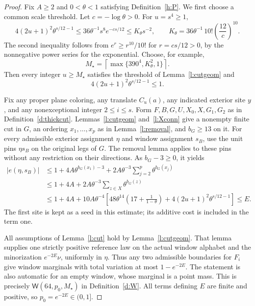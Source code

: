 \begin{proof}
Fix \(A\ge2\) and \(0<\theta<1\) satisfying
Definition~\ref{h:P}.  We first choose a common scale threshold.
Let \(c=-\log\theta>0\).  For \(u=s^4\ge1\),
\[
 4(2u+1)^2\theta^{s/12-1}
       \le36\theta^{-1}s^8 e^{-cs/12}
       \le K_\theta s^{-2},\qquad
 K_\theta=36\theta^{-1}\,10!\left(\frac{12}{c}\right)^{10}.
\]
The second inequality follows from
\(e^r\ge r^{10}/10!\) for \(r=cs/12>0\), by the
nonnegative power series for the exponential.
Choose, for example,
\[
 M_\star=\left\lceil\max\{390^4,K_\theta^2,1\}\right\rceil.
\]
Then every integer \(u\ge M_\star\) satisfies the threshold
of Lemma~\ref{l:cutgeom} and
\begin{equation}\label{e:windowtail}
                 4(2u+1)^2\theta^{s/12-1}\le1.
\end{equation}

Fix any proper plane coloring, any translate \(C_u(a)\),
any indicated exterior site \(y\), and any nonexceptional
integer \(2\le i\le s\).  Form \(F,B,G,U,X_0,X,G_1,G_2\)
as in Definition~\ref{d:thickcut}.  Lemmas~\ref{l:cutgeom}
and~\ref{l:Xconn} give a nonempty finite cut in \(G\), an
ordering \(x_1,\ldots,x_p\) as in Lemma~\ref{l:removal},
and \(b_G\ge13\) on it.  For every admissible exterior
assignment \(\eta\) and window assignment \(s_B\), use the
unit pins \(\eta s_B\) on the original legs of \(G\).
The removal lemma applies to these pins without any restriction
on their directions.  As \(b_G-3\ge0\), it yields
\begin{equation}\label{e:windowcutcost}
 \begin{split}
 |e(\eta,s_B)|
 &\le1+4A\theta^{b_G(x_1)-3}
                    +2A\theta^{-3}\sum_{j=2}^p\theta^{b_G(x_j)}\\
 &\le1+4A+2A\theta^{-3}\sum_{z\in X}\theta^{b_G(z)}\\
 &\le1+4A+10A\theta^{-4}
       \left[48\theta^{14}\left(17+\frac1{1-\theta}\right)
                        +4(2u+1)^2\theta^{s/12-1}\right]
 \le E.
 \end{split}
\end{equation}
The first site is kept as a seed in this estimate; its additive
cost is included in the term one.

All assumptions of Lemma~\ref{l:cut} hold by
Lemma~\ref{l:cutgeom}.  That lemma supplies one strictly
positive reference law on the actual window alphabet and the
minorization \(e^{-2E}\nu\), uniformly in \(\eta\).
Thus any two admissible boundaries for \(F_i\) give window
marginals with total variation at most \(1-e^{-2E}\).
The statement is also automatic for an empty window, whose
marginal is a point mass.  This is precisely
\(\mathsf W(64,p_0,M_\star)\) in Definition~\ref{d:W}.
All terms defining \(E\) are finite and positive, so
\(p_0=e^{-2E}\in(0,1]\).


\end{proof}
